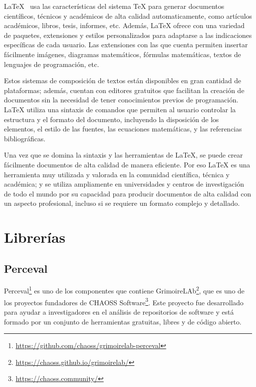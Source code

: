 \documentclass[a4paper, 12pt]{book}
\begin{document}
LaTeX~\cite{rodriguez2014edicion} usa las características del sistema TeX para generar documentos científicos, técnicos y académicos de alta calidad automaticamente, como artículos académicos, libros, tesis, informes, etc.   
Además, LaTeX ofrece con una variedad de paquetes, extensiones y estilos personalizados para adaptarse a las indicaciones específicas de cada usuario.
Las extensiones con las que cuenta permiten insertar fácilmente imágenes, diagramas matemáticos, fórmulas matemáticas, textos de lenguajes de programación, etc.


Estos sistemas de composición de textos están disponibles en gran cantidad de plataformas; además, cuentan con editores gratuitos que facilitan la creación de documentos sin la necesidad de tener conocimientos previos de programación.
LaTeX utiliza una sintaxis de comandos que permiten al usuario controlar la estructura y el formato del documento, incluyendo la disposición de los elementos, el estilo de las fuentes, las ecuaciones matemáticas, y las referencias bibliográficas. 


Una vez que se domina la sintaxis y las herramientas de LaTeX, se puede crear fácilmente documentos de alta calidad de manera eficiente.
Por eso LaTeX es una herramienta muy utilizada y valorada en la comunidad científica, técnica y académica; y se utiliza ampliamente en universidades y centros de investigación de todo el mundo por su capacidad para producir documentos de alta calidad con un aspecto profesional, incluso si se requiere un formato complejo y detallado. 


\section{Librerías} %
\label{sec:librerías}

\subsection{Perceval} %
\label{sec:perceval} %


Perceval\footnote{\url{https://github.com/chaoss/grimoirelab-perceval}} es uno de los componentes que contiene GrimoireLAb\footnote{\url{https://chaoss.github.io/grimoirelab/}}, que es uno de los proyectos fundadores de CHAOSS Software\footnote{\url{https://chaoss.community/}}.
Este proyecto fue desarrollado para ayudar a investigadores en el análisis de repositorios de software y está formado por un conjunto de herramientas gratuitas, libres y de código abierto. 
\end{document}
